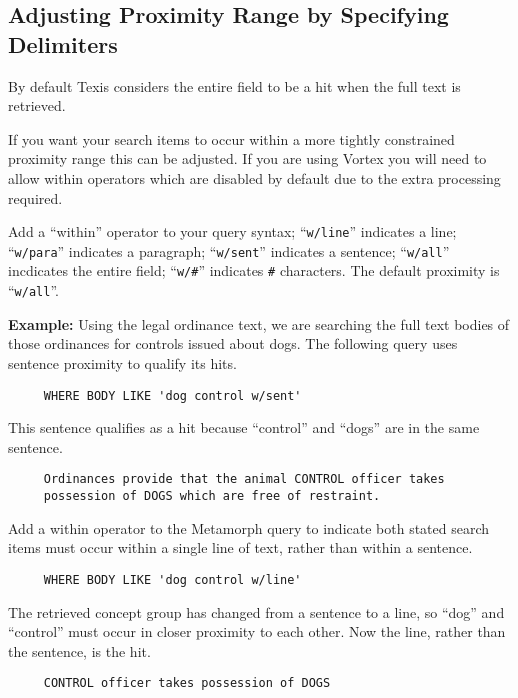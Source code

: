 \subsection{Adjusting Proximity Range by Specifying Delimiters}

By default Texis considers the entire field to be a hit when the
full text is retrieved.

If you want your search items to occur within a more tightly
constrained proximity range this can be adjusted.  If you are using
Vortex you will need to allow within operators which are disabled by
default due to the extra processing required.

Add a ``within'' operator to your query syntax;
``\verb`w/line`'' indicates a line;
``\verb`w/para`'' indicates a paragraph;
``\verb`w/sent`'' indicates a sentence;
 ``\verb`w/all`'' incdicates the entire field;
``\verb`w/#`'' indicates \verb`#` characters.
The default proximity is ``\verb`w/all`''.

{\bf Example:}
Using the legal ordinance text, we are searching the full text bodies
of those ordinances for controls issued about dogs.  The following
query uses sentence proximity to qualify its hits.

\begin{verbatim}
     WHERE BODY LIKE 'dog control w/sent'
\end{verbatim}

This sentence qualifies as a hit because ``control'' and ``dogs'' are
in the same sentence.

\begin{verbatim}
     Ordinances provide that the animal CONTROL officer takes
     possession of DOGS which are free of restraint.
\end{verbatim}

Add a within operator to the Metamorph query to indicate both stated
search items must occur within a single line of text, rather than
within a sentence.

\begin{verbatim}
     WHERE BODY LIKE 'dog control w/line'
\end{verbatim}

The retrieved concept group has changed from a sentence to a line, so
``dog'' and ``control'' must occur in closer proximity to each other.
Now the line, rather than the sentence, is the hit.

\begin{verbatim}
     CONTROL officer takes possession of DOGS
\end{verbatim}

